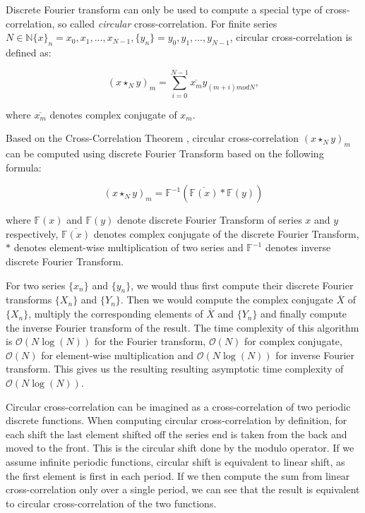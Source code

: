 Discrete Fourier transform can only be used to compute a special type of cross-correlation, so called \textit{circular} cross-correlation.
For finite series $N \in \mathbb{N} \{x\}_n = x_0, x_1, ..., x_{N-1}, \{y_n\} = y_0, y_1, ..., y_{N-1}$, circular cross-correlation is defined as:

\[
(x \star_N y)_m = \sum_{i=0}^{N-1} \overline{x_m} y_{(m + i) mod N},
\]

where $\overline{x_m}$ denotes complex conjugate of $x_m$.


Based on the Cross-Correlation Theorem \citep{thesis:wang}, circular cross-correlation $(x \star_N y)_m$ can be computed using discrete Fourier Transform based on the following formula:

\[
(x \star_N y)_m = \mathbb{F}^{-1}(\overline{\mathbb{F}(x)}*\mathbb{F}(y))
\]

where $\mathbb{F}(x)$ and $\mathbb{F}(y)$ denote discrete Fourier Transform of series $x$ and $y$ respectively, $\overline{\mathbb{F}(x)}$ denotes complex conjugate of the discrete Fourier Transform, $*$ denotes element-wise multiplication of two series and $\mathbb{F}^{-1}$ denotes inverse discrete Fourier Transform.

For two series $\{x_n\}$ and $\{y_n\}$, we would thus first compute their discrete Fourier transforms $\{X_n\}$ and $\{Y_n\}$. Then we would compute the complex conjugate $\overline{X}$ of $\{X_n\}$, multiply the corresponding elements of $\overline{X}$ and $\{Y_n\}$ and finally compute the inverse Fourier transform of the result. The time complexity of this algorithm is $\mathcal{O}(N\log(N))$ for the Fourier transform, $\mathcal{O}(N)$ for complex conjugate, $\mathcal{O}(N)$ for element-wise multiplication and $\mathcal{O}(N\log(N))$ for inverse Fourier transform. This gives us the resulting resulting asymptotic time complexity of $\mathcal{O}(N\log(N))$.


Circular cross-correlation can be imagined as a cross-correlation of two periodic discrete functions. When computing circular cross-correlation by definition, for each shift the last element shifted off the series end is taken from the back and moved to the front. This is the circular shift done by the modulo operator. If we assume infinite periodic functions, circular shift is equivalent to linear shift, as the first element is first in each period. If we then compute the sum from linear cross-correlation only over a single period, we can see that the result is equivalent to circular cross-correlation of the two functions.


